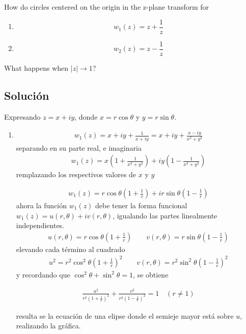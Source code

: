 \begin{problem}{5}
    How do circles centered on the origin in the z-plane transform for
    \begin{enumerate}
        \item $$w_1(z) = z + \frac{1}{z}$$ 
        \item $$w_2(z) = z - \frac{1}{z}$$ 
    \end{enumerate}
    What happens when $|z| \rightarrow 1$?
\end{problem}
\subsection*{Solución}
Expresando $z = x + iy$, donde $x = r\cos\theta$ y $y = r\sin\theta$.
\begin{enumerate}
    \item  
    \begin{gather*}
        w_1(z) = x + iy + \frac{1}{x+iy} = x + iy + \frac{x-iy}{x^2+y^2}
    \end{gather*}
    separando en su parte real, e imaginaria 
    \begin{gather*}
        w_1(z) = x\left(1 + \frac{1}{x^2+y^2}\right) + iy\left(1 - \frac{1}{x^2+y^2}\right)
    \end{gather*}
    remplazando los respectivos valores de $x$ y $y$

    \begin{gather}
        w_1(z) = r\cos\theta\left(1 + \frac{1}{r}\right) + ir\sin\theta\left(1 - \frac{1}{r}\right)
    \end{gather}
    ahora la función $w_1(z)$ debe tener la forma funcional $w_1(z) = u(r,\theta) + iv(r,\theta)$, igualando las partes linealmente independientes.
    \begin{gather*}
        u(r,\theta) = r\cos\theta\left(1 + \frac{1}{r}\right) \quad\quad v(r,\theta) = r\sin\theta\left(1 - \frac{1}{r}\right)
    \end{gather*}
    elevando cada término al cuadrado
    \begin{gather*}
        u^2 = r^2\cos^2\theta\left(1 + \frac{1}{r}\right)^2 \quad\quad v(r,\theta) = r^2\sin^2\theta\left(1 - \frac{1}{r}\right)^2
    \end{gather*}
    y recordando que $\cos^2\theta + \sin^2\theta = 1$, se obtiene 
    
    \begin{result}
        \begin{gather}
            \frac{u^2}{r^2\left(1 + \frac{1}{r}\right)^2} + \frac{v^2}{r^2\left(1 - \frac{1}{r}\right)^2}  = 1 \quad (r\neq 1)
        \end{gather}
    \end{result}
    resulta se la ecuación de una elipse donde el semieje mayor está sobre $u$, realizando la gráfica.


\end{enumerate}
